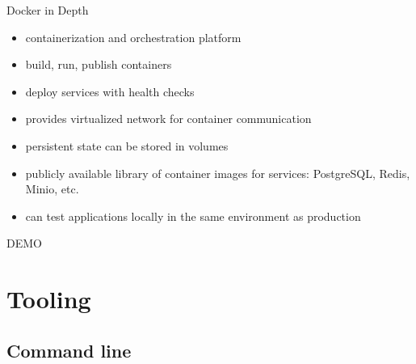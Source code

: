 \documentclass{beamer}
\begin{document}
\begin{frame}{Docker in Depth}
  \begin{itemize}
    \item containerization and orchestration platform
    \item build, run, publish containers
    \item deploy services with health checks
    \item provides virtualized network for container communication
    \item persistent state can be stored in volumes
    \item publicly available library of container images for services:
      PostgreSQL, Redis, Minio, etc.
    \item can test applications locally in the same environment as production
  \end{itemize}
\end{frame}

\begin{frame}
  \Huge DEMO
\end{frame}

\section{Tooling}

\subsection{Command line}
\end{document}
